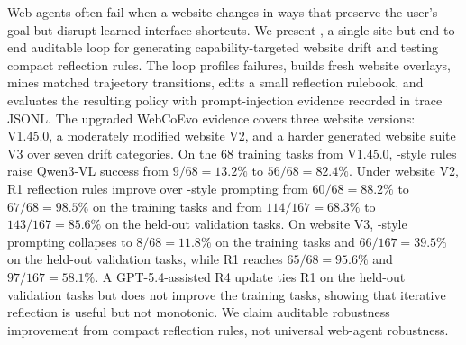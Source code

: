 Web agents often fail when a website changes in ways that preserve the user's goal but disrupt learned interface shortcuts. We present \webcoevo{}, a single-site but end-to-end auditable loop for generating capability-targeted website drift and testing compact reflection rules. The loop profiles failures, builds fresh \linkding{} website overlays, mines matched trajectory transitions, edits a small reflection rulebook, and evaluates the resulting policy with prompt-injection evidence recorded in trace JSONL. The upgraded WebCoEvo evidence covers three website versions: \linkding{} V1.45.0, a moderately modified website V2, and a harder generated website suite V3 over seven drift categories. On the 68 training tasks from \linkding{} V1.45.0, \expel{}-style rules raise Qwen3-VL success from \(9/68=13.2\%\) to \(56/68=82.4\%\). Under website V2, R1 reflection rules improve over \expel{}-style prompting from \(60/68=88.2\%\) to \(67/68=98.5\%\) on the training tasks and from \(114/167=68.3\%\) to \(143/167=85.6\%\) on the held-out validation tasks. On website V3, \expel{}-style prompting collapses to \(8/68=11.8\%\) on the training tasks and \(66/167=39.5\%\) on the held-out validation tasks, while R1 reaches \(65/68=95.6\%\) and \(97/167=58.1\%\). A GPT-5.4-assisted R4 update ties R1 on the held-out validation tasks but does not improve the training tasks, showing that iterative reflection is useful but not monotonic. We claim auditable \linkding{} robustness improvement from compact reflection rules, not universal web-agent robustness.
